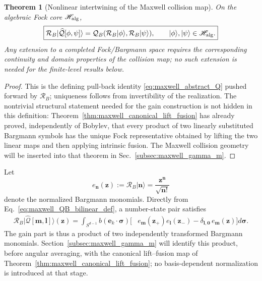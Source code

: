 \documentclass[11pt,oneside]{article}
\numberwithin{equation}{section}
\newtheorem{theorem}{Theorem}[section]
\theoremstyle{definition}
\begin{document}
\begin{theorem}[Nonlinear intertwining of the Maxwell collision map]
\label{thm:maxwell_nonlinear_intertwining}
On the algebraic Fock core $\mathscr H_{\rm alg}$,
\begin{equation}
\boxed{
\mathcal R_B|\widehat{\mathcal Q}[\phi,\psi]\rangle
=
\mathcal Q_B(\mathcal R_B|\phi\rangle,\mathcal R_B|\psi\rangle),
\qquad
|\phi\rangle,|\psi\rangle\in\mathscr H_{\rm alg}.
}
\label{eq:maxwell_nonlinear_intertwining_theorem}
\end{equation}
Any extension to a completed Fock/Bargmann space requires the corresponding continuity and domain properties of the collision map; no such extension is needed for the finite-level results below.
\end{theorem}

\begin{proof}
This is the defining pull-back identity \eqref{eq:maxwell_abstract_Q} pushed forward by $\mathcal R_B$; uniqueness follows from invertibility of the realization.  The nontrivial structural statement needed for the gain construction is not hidden in this definition: Theorem~\ref{thm:maxwell_canonical_lift_fusion} has already proved, independently of Bobylev, that every product of two linearly substituted Bargmann symbols has the unique Fock representative obtained by lifting the two linear maps and then applying intrinsic fusion.  The Maxwell collision geometry will be inserted into that theorem in Sec.~\ref{subsec:maxwell_gamma_m}.
\end{proof}

Let
\begin{equation}
 e_{\bm n}(\bm z)
 :=\mathcal R_B|\bm n\rangle
 =\frac{\bm z^{\bm n}}{\sqrt{\bm n!}}
\label{eq:maxwell_Bargmann_basis_short}
\end{equation}
denote the normalized Bargmann monomials.  Directly from Eq.~\eqref{eq:maxwell_QB_bilinear_def}, a number-state pair satisfies
\begin{equation}
\begin{aligned}
\mathcal R_B|\widehat{\mathcal Q}[\bm m,\bm l]\rangle(\bm z)
=\int_{S^{d-1}}
 b(\bm e_k\!\cdot\!\bm\sigma)
 \Big[
 &e_{\bm m}(\bm z_+)e_{\bm l}(\bm z_-)
 -\delta_{\bm l,\bm0}\,e_{\bm m}(\bm z)
 \Big]d\bm\sigma .
\end{aligned}
\label{eq:maxwell_basis_pair_Bobylev_action}
\end{equation}
The gain part is thus a product of two independently transformed Bargmann monomials.  Section~\ref{subsec:maxwell_gamma_m} will identify this product, before angular averaging, with the canonical lift--fusion map of Theorem~\ref{thm:maxwell_canonical_lift_fusion}; no basis-dependent normalization is introduced at that stage.
\end{document}
